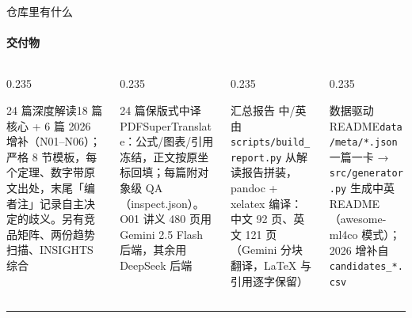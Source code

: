 \documentclass[aspectratio=169,10pt]{beamer}
\begin{document}
\begin{frame}{仓库里有什么}\framesubtitle{交付物}
\begin{columns}[T]
\begin{column}{0.235\textwidth}\begin{block}{24 篇深度解读}\footnotesize 18 篇核心 + 6 篇 2026 增补（N01–N06）；严格 8 节模板，每个定理、数字带原文出处，末尾「编者注」记录自主决定的歧义。另有竞品矩阵、两份趋势扫描、INSIGHTS 综合\end{block}\end{column}
\begin{column}{0.235\textwidth}\begin{block}{24 篇保版式中译 PDF}\footnotesize SuperTranslate：公式/图表/引用冻结，正文按原坐标回填；每篇附对象级 QA（inspect.json）。O01 讲义 480 页用 Gemini 2.5 Flash 后端，其余用 DeepSeek 后端\end{block}\end{column}
\begin{column}{0.235\textwidth}\begin{block}{汇总报告 中/英}\footnotesize 由 \texttt{scripts/build\_report.py} 从解读报告拼装，pandoc + xelatex 编译：中文 92 页、英文 121 页（Gemini 分块翻译，LaTeX 与引用逐字保留）\end{block}\end{column}
\begin{column}{0.235\textwidth}\begin{block}{数据驱动 README}\footnotesize \texttt{data/meta/*.json} 一篇一卡 → \texttt{src/generator.py} 生成中英 README（awesome-ml4co 模式）；2026 增补自 \texttt{candidates\_*.csv}\end{block}\end{column}
\end{columns}
\vfill\hrule\vspace{2pt}{\footnotesize\textcolor{neutral}{发表状态纪律：主会 / 期刊 / Workshop / 预印本分开标，Workshop 绝不写成主会；arXiv comment 滞后时以 OpenReview / dblp / proceedings 为准。}}
\end{frame}
\end{document}
